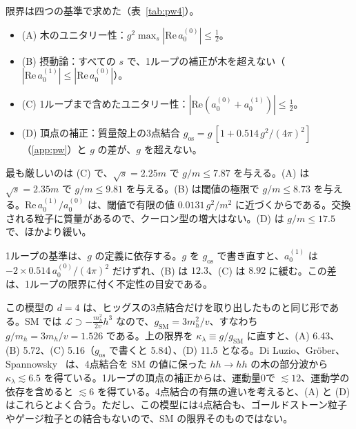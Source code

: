 \documentclass[a4paper,10pt]{ltjsarticle}
\begin{document}
限界は四つの基準で求めた（表~\ref{tab:pw4}）。
\begin{itemize}
\item (A) 木のユニタリー性：$g^2\max_s|\mathrm{Re}\,a_0^{(0)}|\le\frac12$。
\item (B) 摂動論：すべての $s$ で、1ループの補正が木を超えない（$|\mathrm{Re}\,a_0^{(1)}|\le|\mathrm{Re}\,a_0^{(0)}|$）。
\item (C) 1ループまで含めたユニタリー性：$|\mathrm{Re}(a_0^{(0)}+a_0^{(1)})|\le\frac12$。
\item (D) 頂点の補正：質量殻上の3点結合 $g_{\mathrm{os}}=g\,[1+0.514\,g^2/(4\pi)^2]$（\ref{app:pw}）と $g$ の差が、$g$ を超えない。
\end{itemize}
最も厳しいのは (C) で、$\sqrt s=2.25m$ で $g/m\le7.87$ を与える。(A) は $\sqrt s=2.35m$ で $g/m\le9.81$ を与える。(B) は閾値の極限で $g/m\le8.73$ を与える。$\mathrm{Re}\,a_0^{(1)}/a_0^{(0)}$ は、閾値で有限の値 $0.0131\,g^2/m^2$ に近づくからである。交換される粒子に質量があるので、クーロン型の増大はない。(D) は $g/m\le17.5$ で、ほかより緩い。

1ループの基準は、$g$ の定義に依存する。$g$ を $g_{\mathrm{os}}$ で書き直すと、$a_0^{(1)}$ は $-2\times0.514\,a_0^{(0)}/(4\pi)^2$ だけずれ、(B) は $12.3$、(C) は $8.92$ に緩む。この差は、1ループの限界に付く不定性の目安である。

この模型の $d=4$ は、ヒッグスの3点結合だけを取り出したものと同じ形である。SM では $\mathcal{L}\supset-\frac{m_h^2}{2v}h^3$ なので、$g_{\mathrm{SM}}=3m_h^2/v$、すなわち $g/m_h=3m_h/v=1.526$ である。上の限界を $\kappa_\lambda\equiv g/g_{\mathrm{SM}}$ に直すと、(A) 6.43、(B) 5.72、(C) 5.16（$g_{\mathrm{os}}$ で書くと 5.84）、(D) 11.5 となる。Di Luzio、Gröber、Spannowsky~\cite{dgs} は、4点結合を SM の値に保った $hh\to hh$ の木の部分波から $\kappa_\lambda\lesssim6.5$ を得ている。1ループの頂点の補正からは、運動量0で $\lesssim12$、運動学の依存を含めると $\lesssim6$ を得ている。4点結合の有無の違いを考えると、(A) と (D) はこれらとよく合う。ただし、この模型には4点結合も、ゴールドストーン粒子やゲージ粒子との結合もないので、SM の限界そのものではない。
\end{document}
